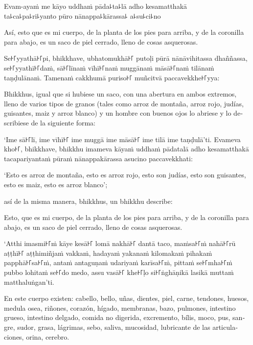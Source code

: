 Evam-ayaṁ me kāyo uddhaṁ pāda꜕ta꜕lā adho kesamatthakā\\
ta꜕ca꜕pa꜕ri꜕yanto pūro nānappa꜕kārassa꜕ a꜕su꜕ci꜕no

\begin{english}
  Así, esto que es mi cuerpo, de la planta de los pies para arriba, y de la coronilla para abajo, es un saco de piel cerrado, lleno de cosas asquerosas.
\end{english}

\clearpage

Se꜔꜒yyathā꜔꜒pi, bhikkhave, ubhatomukhā꜔꜒ putoḷi pūrā nānāvihitassa dhaññassa,
se꜔꜒yyathī꜔꜒daṁ, sā꜔꜒līnaṁ vīhī꜔꜒naṁ muggānaṁ māsā꜔꜒naṁ tilānaṁ taṇḍulānaṁ. Tamenaṁ
cakkhumā puriso꜔꜒ muñcitvā paccavekkhe꜔꜒yya:

\begin{english}
  Bhikkhus, igual que si hubiese un saco, con una abertura en ambos extremos, lleno de varios tipos de granos (tales como arroz de montaña, arroz rojo, judías, guisantes, maiz y arroz blanco) y un hombre con buenos ojos lo abriese y lo describiese de la siguiente forma:
\end{english}

‘Ime sā꜔꜒lī, ime vīhī꜔꜒ ime muggā ime māsā꜔꜒ ime tilā ime taṇḍulā’ti. Evameva kho꜔꜒,
bhikkhave, bhikkhu imameva kāyaṁ uddhaṁ pādatalā adho kesamatthakā
tacapariyantaṁ pūraṁ nānappakārassa asucino paccavekkhati:

\begin{english}
  ‘Esto es arroz de montaña, esto es arroz rojo, esto son judías, esto son guisantes,
  esto es maiz, esto es arroz blanco’;

  así de la misma manera, bhikkhus, un bhikkhu describe:

  Esto, que es mi cuerpo, de la planta de los pies para arriba, y de la coronilla para abajo, es un saco de piel cerrado, lleno de cosas asquerosas.
\end{english}

‘Atthi imasmi꜔꜒ṁ kāye kesā꜔꜒ lomā nakhā꜔꜒ dantā taco, maṁsa꜔꜒ṁ nahā꜔꜒rū aṭṭhī꜔꜒ aṭṭhimiñjaṁ
vakkaṁ, hadayaṁ yakanaṁ kilomakaṁ pihakaṁ papphā꜔꜒sa꜔꜒ṁ, antaṁ antaguṇaṁ udariyaṁ
karīsa꜔꜒ṁ, pittaṁ se꜔꜒mha꜔꜒ṁ pubbo lohitaṁ se꜔꜒do medo, assu vasā꜔꜒ khe꜔꜒ḷo si꜔꜒ṅghāṇikā
lasikā muttaṁ matthaluṅgan’ti.

\clearpage

\begin{english}
  En este cuerpo existen:
  cabello, bello, uñas, dientes, piel,
  carne, tendones, huesos, medula osea, riñones,
  corazón, hígado, membranas, bazo, pulmones,
  intestino grueso, intestino delgado, comida no digerida, excremento,
  bílis, moco, pus, sangre, sudor, grasa,
  lágrimas, sebo, saliva, mucosidad, lubricante de las articulaciones, orina, cerebro.
\end{english}

